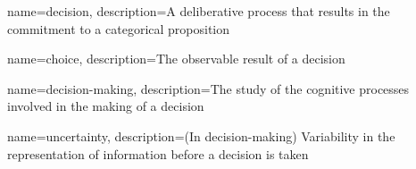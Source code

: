 {
    name=decision,
    description={A deliberative process that results in the commitment to a categorical proposition \cite{goldNeuralBasisDecision2007}}
}

{
    name=choice,
    description={The observable result of a decision}
}

{
    name=decision-making,
    description={The study of the cognitive processes involved in the making of a decision}
}

{
    name=uncertainty,
    description={(In decision-making) Variability in the representation of information before a decision is taken \cite{mamassianConfidenceForcedChoiceOther2020}}
}

